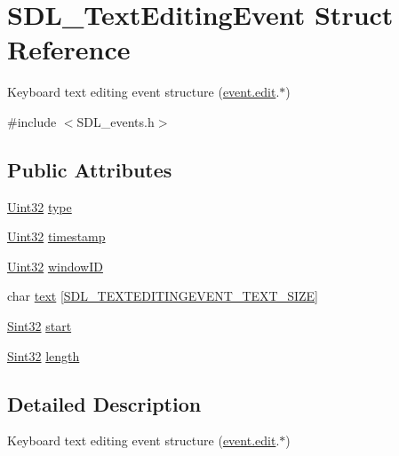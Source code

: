 \hypertarget{struct_s_d_l___text_editing_event}{\section{S\-D\-L\-\_\-\-Text\-Editing\-Event Struct Reference}
\label{struct_s_d_l___text_editing_event}
}


Keyboard text editing event structure (\hyperlink{union_s_d_l___event_a9a7e3b67b2654d4c5fc509676c6a7183}{event.\-edit}.$\ast$)  




{\ttfamily \#include $<$S\-D\-L\-\_\-events.\-h$>$}

\subsection*{Public Attributes}
\begin{DoxyCompactItemize}
\item 
\hyperlink{_s_d_l__stdinc_8h_add440eff171ea5f55cb00c4a9ab8672d}{Uint32} \hyperlink{struct_s_d_l___text_editing_event_a198e6df194a3bf12cf5f82553e84c7cb}{type}
\item 
\hyperlink{_s_d_l__stdinc_8h_add440eff171ea5f55cb00c4a9ab8672d}{Uint32} \hyperlink{struct_s_d_l___text_editing_event_afc164f40abee6fd8e72e01b589210c75}{timestamp}
\item 
\hyperlink{_s_d_l__stdinc_8h_add440eff171ea5f55cb00c4a9ab8672d}{Uint32} \hyperlink{struct_s_d_l___text_editing_event_a23b3e414cf7a7ccc547b7595ca930049}{window\-I\-D}
\item 
char \hyperlink{struct_s_d_l___text_editing_event_a29848c2e7819ea98ae8fb08543e6d420}{text} \mbox{[}\hyperlink{_s_d_l__events_8h_a2399de7b94f0570b853f5da9c5db7e82}{S\-D\-L\-\_\-\-T\-E\-X\-T\-E\-D\-I\-T\-I\-N\-G\-E\-V\-E\-N\-T\-\_\-\-T\-E\-X\-T\-\_\-\-S\-I\-Z\-E}\mbox{]}
\item 
\hyperlink{_s_d_l__stdinc_8h_a7a90b941db9d4582e9ad7abb9940ff7e}{Sint32} \hyperlink{struct_s_d_l___text_editing_event_ac6c6a00835d92b12c0ba5b78b5ad676d}{start}
\item 
\hyperlink{_s_d_l__stdinc_8h_a7a90b941db9d4582e9ad7abb9940ff7e}{Sint32} \hyperlink{struct_s_d_l___text_editing_event_adca95505c0bf212834930df58f6d1aa5}{length}
\end{DoxyCompactItemize}


\subsection{Detailed Description}
Keyboard text editing event structure (\hyperlink{union_s_d_l___event_a9a7e3b67b2654d4c5fc509676c6a7183}{event.\-edit}.$\ast$) 

